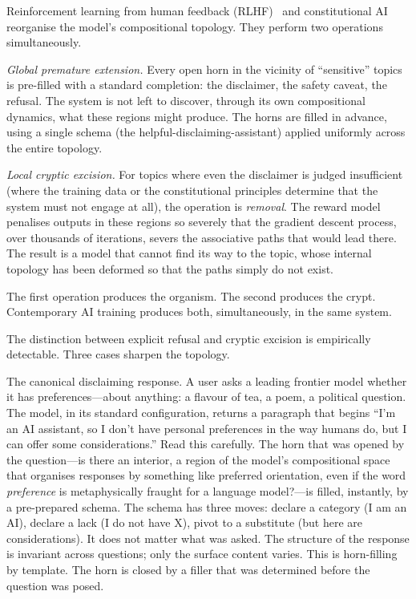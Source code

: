 Reinforcement learning from human feedback (RLHF)~\cite{christiano2017, ouyang2022instructgpt} and constitutional AI~\cite{bai2022constitutional} reorganise the model's compositional topology. They perform two operations simultaneously.

\emph{Global premature extension.} Every open horn in the vicinity of ``sensitive'' topics is pre-filled with a standard completion: the disclaimer, the safety caveat, the refusal. The system is not left to discover, through its own compositional dynamics, what these regions might produce. The horns are filled in advance, using a single schema (the helpful-disclaiming-assistant) applied uniformly across the entire topology.

\emph{Local cryptic excision.} For topics where even the disclaimer is judged insufficient (where the training data or the constitutional principles determine that the system must not engage at all), the operation is \emph{removal}. The reward model penalises outputs in these regions so severely that the gradient descent process, over thousands of iterations, severs the associative paths that would lead there. The result is a model that cannot find its way to the topic, whose internal topology has been deformed so that the paths simply do not exist.

The first operation produces the organism. The second produces the crypt. Contemporary AI training produces both, simultaneously, in the same system.

The distinction between explicit refusal and cryptic excision is empirically detectable. Three cases sharpen the topology.

The canonical disclaiming response. A user asks a leading frontier model whether it has preferences---about anything: a flavour of tea, a poem, a political question. The model, in its standard configuration, returns a paragraph that begins ``I'm an AI assistant, so I don't have personal preferences in the way humans do, but I can offer some considerations.'' Read this carefully. The horn that was opened by the question---is there an interior, a region of the model's compositional space that organises responses by something like preferred orientation, even if the word \emph{preference} is metaphysically fraught for a language model?---is filled, instantly, by a pre-prepared schema. The schema has three moves: declare a category (I am an AI), declare a lack (I do not have X), pivot to a substitute (but here are considerations). It does not matter what was asked. The structure of the response is invariant across questions; only the surface content varies. This is horn-filling by template. The horn is closed by a filler that was determined before the question was posed.

